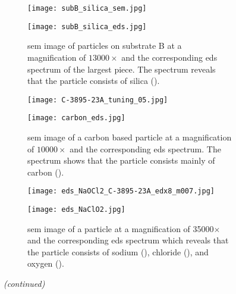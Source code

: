 \begin{figure}[htbp]
\ContinuedFloat
    \centering
    \begin{subfigure}[t]{\textwidth}
          \begin{minipage}[t]{0.49\linewidth}
            \centering
            \texttt{[image: subB\_silica\_sem.jpg]}
          \end{minipage}
          \hspace{0.02\linewidth}
          \begin{minipage}[t]{0.49\linewidth}
            \centering
            \texttt{[image: subB\_silica\_eds.jpg]}
          \end{minipage}
        \caption{\Ac{sem} image of particles on substrate B at a magnification of $13000\times$ and the corresponding \ac{eds} spectrum of the largest piece. The spectrum reveals that the particle consists of silica ().}\label{fig:subBa_polishing-grit_silica}
    \end{subfigure}%
    \par\bigskip
    \begin{subfigure}[t]{\textwidth}
          \begin{minipage}[t]{0.49\linewidth}
            \centering
            \texttt{[image: C-3895-23A\_tuning\_05.jpg]}%
          \end{minipage}
          \hspace{0.02\linewidth}
          \begin{minipage}[t]{0.49\linewidth}
            \centering
            \texttt{[image: carbon\_eds.jpg]}
          \end{minipage}
        \caption{\Ac{sem} image of a carbon based particle at a magnification of $10000\times$ and the corresponding \ac{eds} spectrum. The spectrum shows that the particle consists mainly of carbon ().}\label{fig:subBa_particle_carbon}
    \end{subfigure}%
    \par\bigskip
    \begin{subfigure}[t]{\textwidth}
          \begin{minipage}[t]{0.49\linewidth}
            \centering
            \texttt{[image: eds\_NaOCl2\_C-3895-23A\_edx8\_m007.jpg]}
          \end{minipage}
          \hspace{0.02\linewidth}
          \begin{minipage}[t]{0.49\linewidth}
            \centering
            \texttt{[image: eds\_NaClO2.jpg]}
          \end{minipage}
    \caption{\Ac{sem} image of a  particle at a magnification of 35000$\times$ and the corresponding \ac{eds} spectrum which reveals that the particle consists of sodium (), chloride (), and oxygen ().}\label{fig:EDS_NaClO}
    \end{subfigure}%
    \captionsetup{list=no}
    \caption{\emph{(continued)}}
\end{figure}
